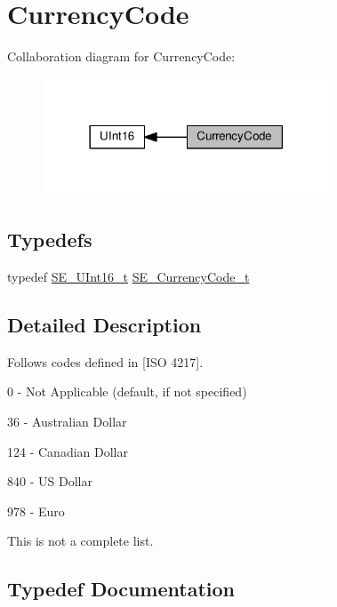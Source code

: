 \hypertarget{group__CurrencyCode}{}\section{Currency\+Code}
\label{group__CurrencyCode}
Collaboration diagram for Currency\+Code\+:\nopagebreak
\begin{figure}[H]
\begin{center}
\leavevmode
\includegraphics[width=242pt]{group__CurrencyCode}
\end{center}
\end{figure}
\subsection*{Typedefs}
\begin{DoxyCompactItemize}
\item 
typedef \hyperlink{group__UInt16_gac68d541f189538bfd30cfaa712d20d29}{S\+E\+\_\+\+U\+Int16\+\_\+t} \hyperlink{group__CurrencyCode_gadef02433fe757d7bd9fd0d9b59f690a0}{S\+E\+\_\+\+Currency\+Code\+\_\+t}
\end{DoxyCompactItemize}


\subsection{Detailed Description}
Follows codes defined in \mbox{[}I\+SO 4217\mbox{]}.

0 -\/ Not Applicable (default, if not specified)

36 -\/ Australian Dollar

124 -\/ Canadian Dollar

840 -\/ US Dollar

978 -\/ Euro

This is not a complete list. 

\subsection{Typedef Documentation}
\mbox{\label{group__CurrencyCode_gadef02433fe757d7bd9fd0d9b59f690a0}} 
